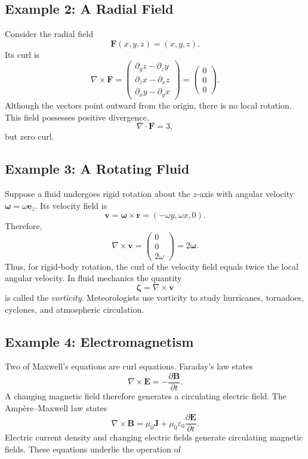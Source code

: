 \subsection{Example 2: A Radial Field}

Consider the radial field
\[
\mathbf F(x,y,z)=(x,y,z).
\]
Its curl is
\[
\nabla\times\mathbf F
=
\begin{pmatrix}
\partial_y z-\partial_z y\\
\partial_z x-\partial_x z\\
\partial_x y-\partial_y x
\end{pmatrix}
=
\begin{pmatrix}
0\\0\\0
\end{pmatrix}.
\]
Although the vectors point outward from the origin, there is no local rotation.
This field possesses positive divergence,
\[
\nabla\cdot\mathbf F=3,
\]
but zero curl.

\subsection{Example 3: A Rotating Fluid}

Suppose a fluid undergoes rigid rotation about the $z$-axis with angular
velocity $\boldsymbol\omega=\omega\mathbf e_z$. Its velocity field is
\[
\mathbf v=\boldsymbol\omega\times\mathbf r
=(-\omega y,\omega x,0).
\]
Therefore,
\[
\nabla\times\mathbf v
=
\begin{pmatrix}
0\\0\\2\omega
\end{pmatrix}
=2\boldsymbol\omega.
\]
Thus, for rigid-body rotation, the curl of the velocity field equals twice the
local angular velocity. In fluid mechanics the quantity
\[
\boldsymbol\zeta=\nabla\times\mathbf v
\]
is called the \emph{vorticity}. Meteorologists use vorticity to study
hurricanes, tornadoes, cyclones, and atmospheric circulation.

\subsection{Example 4: Electromagnetism}

Two of Maxwell's equations are curl equations. Faraday's law states
\[
\boxed{
\nabla\times\mathbf E
=-\frac{\partial\mathbf B}{\partial t}.
}
\]
A changing magnetic field therefore generates a circulating electric field.
The Amp\`ere--Maxwell law states
\[
\boxed{
\nabla\times\mathbf B
=
\mu_0\mathbf J
+
\mu_0\varepsilon_0
\frac{\partial\mathbf E}{\partial t}.
}
\]
Electric current density and changing electric fields generate circulating
magnetic fields. These equations underlie the operation of

